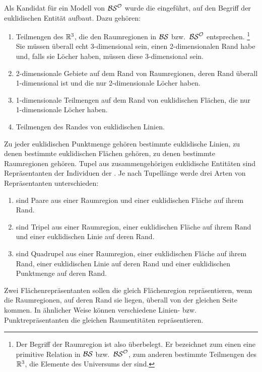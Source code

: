     Als
    Kandidat für ein Modell von $\mathcal{BS}^{\mathcal{O}}$ wurde die \strukt eingeführt, auf den Begriff der euklidischen Entität aufbaut.
    Dazu gehören:
    \begin{enumerate}
        \item {} Teilmengen des $\mathbb{R}^3$, die den Raumregionen in $\mathcal{BS}$ bzw.\ $\mathcal{BS}^{\mathcal{O}}$ entsprechen.%
        \footnote{Der Begriff der Raumregion ist also überbelegt. Er bezeichnet zum einen eine primitive Relation in $\mathcal{BS}$ bzw.\ $\mathcal{BS}^{\mathcal{O}}$, zum anderen bestimmte Teilmengen des $\mathbb{R}^3$, die Elemente des Universums der \strukt sind.}
        Sie müssen überall echt 3-dimensional sein, einen 2-dimensionalen Rand habe und, falls sie Löcher haben, müssen diese 3-dimensional sein.
        \item {} 2-dimensionale Gebiete auf dem Rand von %
        Raumregionen, deren Rand überall 1-dimensional ist und die nur 2-dimensionale Löcher haben.
        \item {} 1-dimensionale Teilmengen auf dem Rand von euklidischen Flächen, die nur 1-dimensionale Löcher haben.
        \item {} Teilmengen des Randes von euklidischen Linien.
    \end{enumerate}
    Zu
    jeder euklidischen Punktmenge gehören bestimmte euklidische Linien, zu denen bestimmte euklidischen Flächen gehören, zu denen bestimmte Raumregionen gehören.
    Tupel aus zusammengehörigen euklidische Entitäten sind Repräsentanten der Individuen der \strukt.
    Je nach Tupellänge werde drei Arten von Repräsentanten unterschieden:
    \begin{enumerate}
        \item {} 
            sind Paare aus einer Raumregion und einer euklidischen Fläche auf ihrem Rand.
        \item {}
            sind Tripel aus einer Raumregion, einer euklidischen Fläche auf ihrem Rand und einer euklidischen Linie auf deren Rand.
        \item {}
            sind Quadrupel aus einer Raumregion, einer euklidischen Fläche auf ihrem Rand, einer euklidischen Linie auf deren Rand und einer euklidischen Punktmenge auf deren Rand.%
    \end{enumerate}
    Zwei
    Flächenrepräsentanten sollen die gleich Flächenregion repräsentieren, wenn die Raumregionen, auf deren Rand sie liegen, überall 
    \glqq von der gleichen Seite kommen\grqq.
    In ähnlicher Weise können verschiedene Linien- bzw. Punktrepräsentanten die gleichen Raumentitäten repräsentieren.
    
